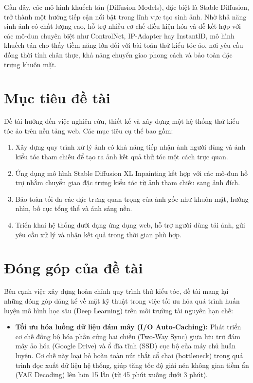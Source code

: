 \documentclass[../main.tex]{subfiles}
\begin{document}
Gần đây, các mô hình khuếch tán (Diffusion Models), đặc biệt là Stable Diffusion, trở thành một hướng tiếp cận nổi bật trong lĩnh vực tạo sinh ảnh. Nhờ khả năng sinh ảnh có chất lượng cao, hỗ trợ nhiều cơ chế điều kiện hóa và dễ kết hợp với các mô-đun chuyên biệt như ControlNet, IP-Adapter hay InstantID, mô hình khuếch tán cho thấy tiềm năng lớn đối với bài toán thử kiểu tóc ảo, nơi yêu cầu đồng thời tính chân thực, khả năng chuyển giao phong cách và bảo toàn đặc trưng khuôn mặt.

\section{Mục tiêu đề tài}
Đề tài hướng đến việc nghiên cứu, thiết kế và xây dựng một hệ thống thử kiểu tóc ảo trên nền tảng web. Các mục tiêu cụ thể bao gồm:
\begin{enumerate}
    \item Xây dựng quy trình xử lý ảnh có khả năng tiếp nhận ảnh người dùng và ảnh kiểu tóc tham chiếu để tạo ra ảnh kết quả thử tóc một cách trực quan.
    \item Ứng dụng mô hình Stable Diffusion XL Inpainting kết hợp với các mô-đun hỗ trợ nhằm chuyển giao đặc trưng kiểu tóc từ ảnh tham chiếu sang ảnh đích.
    \item Bảo toàn tối đa các đặc trưng quan trọng của ảnh gốc như khuôn mặt, hướng nhìn, bố cục tổng thể và ánh sáng nền.
    \item Triển khai hệ thống dưới dạng ứng dụng web, hỗ trợ người dùng tải ảnh, gửi yêu cầu xử lý và nhận kết quả trong thời gian phù hợp.
\end{enumerate}

\section{Đóng góp của đề tài}
Bên cạnh việc xây dựng hoàn chỉnh quy trình thử kiểu tóc, đề tài mang lại những đóng góp đáng kể về mặt kỹ thuật trong việc tối ưu hóa quá trình huấn luyện mô hình học sâu (Deep Learning) trên môi trường tài nguyên hạn chế:
\begin{itemize}
    \item \textbf{Tối ưu hóa luồng dữ liệu đám mây (I/O Auto-Caching):} Phát triển cơ chế đồng bộ hóa phần cứng hai chiều (Two-Way Sync) giữa lưu trữ đám mây ảo hóa (Google Drive) và ổ đĩa tĩnh (SSD) cục bộ của máy chủ huấn luyện. Cơ chế này loại bỏ hoàn toàn nút thắt cổ chai (bottleneck) trong quá trình đọc xuất dữ liệu hệ thống, giúp tăng tốc độ giải nén không gian tiềm ẩn (VAE Decoding) lên hơn 15 lần (từ 45 phút xuống dưới 3 phút).
\end{itemize}
\end{document}
